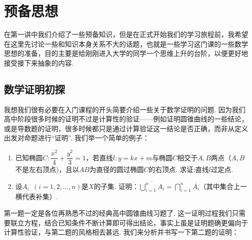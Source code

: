 \begingroup
{}
\def\theHchapter{\arabic{chapter}ε}

\chapter{预备思想}

在第一讲中我们介绍了一些预备知识，但是在正式开始我们的学习旅程前，我希望在这里先讨论一些和知识本身关系不大的话题，也就是一些学习这门课的一些数学思想的准备，目的主要是给刚刚进入大学的同学一个思维上升的台阶，以便更好地接受接下来抽象的内容.

\section{数学证明初探}

我想我们很有必要在入门课程的开头简要介绍一些关于数学证明的问题. 因为我们高中阶段很多时候的证明不过是计算性的验证——例如证明圆锥曲线的一些结论，或是导数题的证明，很多时候都只是通过计算验证这一结论是否正确，而非从定义出发对命题进行``证明''. 我们举一个简单的例子：

\begin{example}
    \begin{enumerate}
        \item 已知椭圆$C:\dfrac{x^2}{4}+\dfrac{y^2}{3}=1$，若直线$l:y=kx+m$与椭圆$C$相交于$A,B$两点（$A,B$不是左右顶点)，且以$AB$为直径的圆过椭圆$C$的右顶点. 求证:直线$l$过定点.

        \item 设$A_i\enspace(i=1,2,\ldots,n)$是$X$的子集. 证明：$\overline{\displaystyle\bigcup_{i=1}^nA_i}=\displaystyle\bigcap_{i=1}^n\overline{A_i}$（其中集合上一横代表补集）.
    \end{enumerate}
\end{example}

第一题一定是各位再熟悉不过的经典高中圆锥曲线习题了. 这一证明过程我们只需要联立方程，结合已知条件不断计算即可得出结论，事实上虽是证明题确更偏向于计算性验证，与第二题的风格相去甚远. 我们来分析并书写一下第二题的证明：

